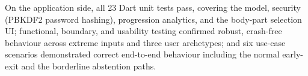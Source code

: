 On the application side, all 23 Dart unit tests pass, covering the model,
security (PBKDF2 password hashing), progression analytics, and the body-part
selection UI; functional, boundary, and usability testing confirmed robust,
crash-free behaviour across extreme inputs and three user archetypes; and six
use-case scenarios demonstrated correct end-to-end behaviour including the
normal early-exit and the borderline abstention paths.
